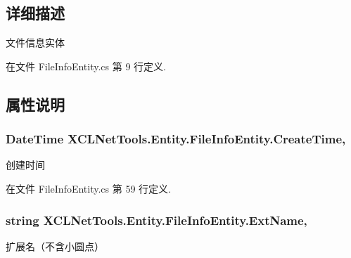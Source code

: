 \subsection{详细描述}
文件信息实体 



在文件 File\-Info\-Entity.\-cs 第 9 行定义.



\subsection{属性说明}
\hypertarget{class_x_c_l_net_tools_1_1_entity_1_1_file_info_entity_a93fc7b2a3119885d9449d1817e7306ca}{
\subsubsection[{Create\-Time}]{\setlength{\rightskip}{0pt plus 5cm}Date\-Time X\-C\-L\-Net\-Tools.\-Entity.\-File\-Info\-Entity.\-Create\-Time\hspace{0.3cm}{\ttfamily [get]}, {\ttfamily [set]}}}\label{class_x_c_l_net_tools_1_1_entity_1_1_file_info_entity_a93fc7b2a3119885d9449d1817e7306ca}


创建时间 



在文件 File\-Info\-Entity.\-cs 第 59 行定义.

\hypertarget{class_x_c_l_net_tools_1_1_entity_1_1_file_info_entity_a46ccaf5dbcc1154782c0227c83eb54e4}{
\subsubsection[{Ext\-Name}]{\setlength{\rightskip}{0pt plus 5cm}string X\-C\-L\-Net\-Tools.\-Entity.\-File\-Info\-Entity.\-Ext\-Name\hspace{0.3cm}{\ttfamily [get]}, {\ttfamily [set]}}}\label{class_x_c_l_net_tools_1_1_entity_1_1_file_info_entity_a46ccaf5dbcc1154782c0227c83eb54e4}


扩展名（不含小圆点） 




